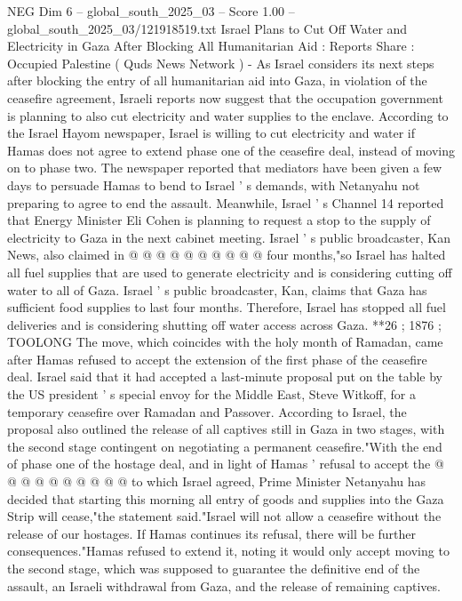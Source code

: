 \begin{textsample}{NEG Dim 6 – global\_south\_2025\_03 – Score 1.00 – global\_south\_2025\_03/121918519.txt}  \label{ex:f6_neg_225}
Israel Plans to Cut Off Water and Electricity in Gaza After Blocking All Humanitarian Aid : Reports Share : Occupied Palestine ( Quds News Network ) - As Israel considers its next steps after blocking the entry of all humanitarian aid into Gaza, in violation of the ceasefire agreement, Israeli reports now suggest that the occupation government is planning to also cut electricity and water supplies to the enclave.
According to the Israel Hayom newspaper, Israel is willing to cut electricity and water if Hamas does not agree to extend phase one of the ceasefire deal, instead of moving on to phase two.
The newspaper reported that mediators have been given a few days to persuade Hamas to bend to Israel ' s demands, with Netanyahu not preparing to agree to end the assault.
Meanwhile, Israel ' s Channel 14 reported that Energy Minister Eli Cohen is planning to request a stop to the supply of electricity to Gaza in the next cabinet meeting.
Israel ' s public broadcaster, Kan News, also claimed in @ @ @ @ @ @ @ @ @ @ four months,"so Israel has halted all fuel supplies that are used to generate electricity and is considering cutting off water to all of Gaza.
Israel ' s public broadcaster, Kan, claims that Gaza has sufficient food supplies to last four months.
Therefore, Israel has stopped all fuel deliveries and is considering shutting off water access across Gaza. **26 ; 1876 ; TOOLONG The move, which coincides with the holy month of Ramadan, came after Hamas refused to accept the extension of the first phase of the ceasefire deal.
Israel said that it had accepted a last-minute proposal put on the table by the US president ' s special envoy for the Middle East, Steve Witkoff, for a temporary ceasefire over Ramadan and Passover.
According to Israel, the proposal also outlined the release of all captives still in Gaza in two stages, with the second stage contingent on negotiating a permanent ceasefire."With the end of phase one of the hostage deal, and in light of Hamas ' refusal to accept the @ @ @ @ @ @ @ @ @ @ to which Israel agreed, Prime Minister Netanyahu has decided that starting this morning all entry of goods and supplies into the Gaza Strip will cease,"the statement said."Israel will not allow a ceasefire without the release of our hostages.
If Hamas continues its refusal, there will be further consequences."Hamas refused to extend it, noting it would only accept moving to the second stage, which was supposed to guarantee the definitive end of the assault, an Israeli withdrawal from Gaza, and the release of remaining captives.

\end{textsample}
